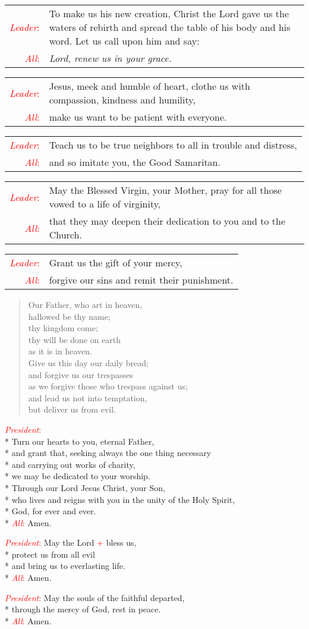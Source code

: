 \documentclass[letterpaper,14pt]{extarticle}
\newcommand{\side}[1]{\flagverse{\textcolor{red}{\textit{#1}}:}}
\newcommand{\sidestar}[1]{\textcolor{red}{\textit{#1}:}}
\newcommand{\rednote}[1]{\textcolor{red}{#1}}
\newlength{\oldindent}
\newcommand{\antiphon}[2]{
	\setlength{\oldindent}{\vindent}
	\setlength{\vindent}{0em}
	\begin{verse}
	\side{#1} \textbf{#2}
	\end{verse}
	\setlength{\vindent}{\oldindent}
}
\newcommand{\intercession}[2]{
	\begin{tabular}[h]{r p{4.25in}}
		\sidestar{Leader} & #1 \\
		\sidestar{All} & #2
	\end{tabular}}
\begin{document}
\intercession{To make us his new creation, Christ the Lord gave us the waters of rebirth and spread the table of his body and his word. Let us call upon him and say:}
{\textit{Lord, renew us in your grace.}}

\intercession{Jesus, meek and humble of heart, clothe us with compassion, kindness and humility,}
{make us want to be patient with everyone.}

\intercession{Teach us to be true neighbors to all in trouble and distress,}
{and so imitate you, the Good Samaritan.}

\intercession{May the Blessed Virgin, your Mother, pray for all those vowed to a life of virginity,}
{that they may deepen their dedication to you and to the Church.}

\intercession{Grant us the gift of your mercy,}
{forgive our sins and remit their punishment.}

	
\begin{verse}
	\side{All} Our Father, who art in heaven,\\ %
hallowed be thy name; \\
thy kingdom come; \\
thy will be done on earth \\
as it is in heaven. \\
Give us this day our daily bread; \\
and forgive us our trespasses \\
as we forgive those who trespass against us; \\
and lead us not into temptation, \\
but deliver us from evil.
\end{verse}


\sidestar{President}\\*
Turn our hearts to you, eternal Father, \\*
and grant that, seeking always the one thing necessary\\*
and carrying out works of charity,\\*
we may be dedicated to your worship.\\*
Through our Lord Jesus Christ, your Son,\\*
who lives and reigns with you in the unity of the Holy Spirit,\\*
God, for ever and ever.\\*
\sidestar{All} Amen.


\sidestar{President}
May the Lord \rednote{+} bless us, \\*
protect us from all evil \\*
and bring us to everlasting life. \\*
\sidestar{All} Amen.

\sidestar{President}
May the souls of the faithful departed,  \\*
through the mercy of God, rest in peace. \\*
\sidestar{All} Amen.
\end{document}
